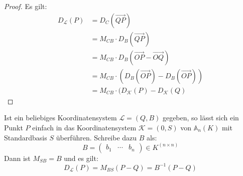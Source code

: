 \documentclass[parskip,a4paper,twoside,DIV15,BCOR12mm]{scrbook}
\begin{document}
\begin{proof}
Es gilt:
\begin{align*}
D_\mathcal{L}(P)&=D_C(\overrightarrow{QP})\\
&=M_{CB}\cdot D_B(\overrightarrow{QP})\\
&=M_{CB}\cdot D_B(\overrightarrow{OP}-\overrightarrow{OQ})\\
&=M_{CB}\cdot (D_B(\overrightarrow{OP})-D_B(\overrightarrow{OP}))\\
&=M_{CB}\cdot(D_\mathcal{K}(P)-D_\mathcal{K}(Q)
\end{align*}
\end{proof}

\begin{application}
Ist ein beliebiges Koordinatensystem $\mathcal{L}=(Q,B)$ gegeben, so lässt sich ein 
Punkt $P$ einfach in das Koordinatensystem $\mathcal{K}=(0,S)$ von $\mathbb{A}_n(K)$ 
mit Standardbasis $S$ überführen. Schreibe dazu $B$ als:
\[B=\begin{pmatrix}b_1&\cdots &b_n\end{pmatrix}\in K^{(n\times n)}\]
Dann ist $M_{SB}=B$ und es gilt:
\[D_\mathcal{L}(P)=M_{BS}(P-Q)=B^{-1}(P-Q)\]
\end{application}

\renewcommand{\indexname}{Stichwortverzeichnis}
\printindex
\end{document}
